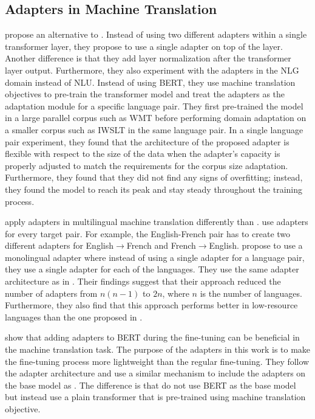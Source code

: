 \subsection{Adapters in Machine Translation}
\label{sec:app_mt}
 propose an alternative to . Instead of using two different adapters within a single transformer layer, they propose to use a single adapter on top of the layer. Another difference is that they add layer normalization after the transformer layer output. Furthermore, they also experiment with the adapters in the NLG domain instead of NLU. Instead of using BERT, they use machine translation objectives to pre-train the transformer model and treat the adapters as the adaptation module for a specific language pair. They first pre-trained the model in a large parallel corpus such as WMT before performing domain adaptation on a smaller corpus such as IWSLT in the same language pair. In a single language pair experiment, they found that the architecture of the proposed adapter is flexible with respect to the size of the data when the adapter's capacity is properly adjusted to match the requirements for the corpus size adaptation. Furthermore, they found that they did not find any signs of overfitting; instead, they found the model to reach its peak and stay steady throughout the training process.

 apply adapters in multilingual machine translation differently than .  use adapters for every target pair. For example, the English-French pair has to create two different adapters for English$\rightarrow$French and French$\rightarrow$English.  propose to use a monolingual adapter where instead of using a single adapter for a language pair, they use a single adapter for each of the languages. They use the same adapter architecture as in . Their findings suggest that their approach reduced the number of adapters from $n(n-1)$ to $2n$, where $n$ is the number of languages. Furthermore, they also find that this approach performs better in low-resource languages than the one proposed in .

 show that adding adapters to BERT during the fine-tuning can be beneficial in the machine translation task. The purpose of the adapters in this work is to make the fine-tuning process more lightweight than the regular fine-tuning. They follow the adapter architecture and use a similar mechanism to include the adapters on the base model as . The difference is that  do not use BERT as the base model but instead use a plain transformer that is pre-trained using machine translation objective.
